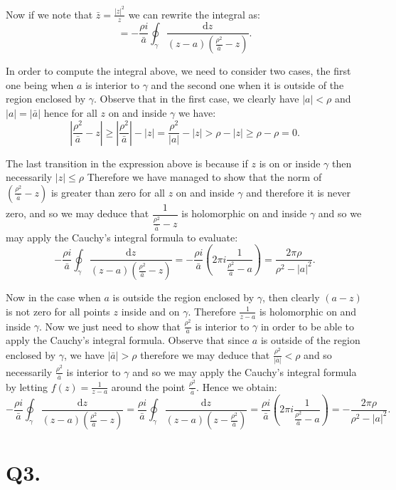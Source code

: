 \documentclass[12pt]{article}
\begin{document}
Now if we note that $\bar{z} = \frac{|z|^2}{z}$ we can rewrite the integral as:
\[
	= - \frac{\rho i}{\bar{a}}\oint_\gamma \frac{\text{d}z}{(z - a) (\frac{\rho^2}{\bar{a}} - z)} 
.\]

In order to compute the integral above, we need to consider two cases, the first one being when $a$ is interior to 
 $\gamma$ and the second one when  it is outside of the region enclosed by $\gamma$. 
 Observe that in the first case, we clearly have $|a| < \rho$ and $|a| = |\bar{a}|$ hence for all  $z$ on and inside  $\gamma$ we have:
\[
 \left|\frac{\rho^2}{\bar{a}} - z\right| \ge \left|\frac{\rho^2}{\bar{a}}\right| - |z| = 
	 \frac{\rho^2}{|a|} - |z| > \rho - |z| \geq \rho - \rho = 0
.\]

The last transition in the expression above is because if $z$ is on or inside $\gamma$ then necessarily $|z| \leq \rho$
Therefore we have managed to show that the norm of $(\frac{\rho^2}{\bar{a}} - z)$ is greater than zero for all $z$ on 
and inside $\gamma$ and therefore it is never zero, and so we may deduce that  $\dfrac{1}{\frac{\rho^2}{\bar{a}} - z}$ 
is holomorphic on and inside $\gamma$ and so we may apply the Cauchy's integral formula to evaluate:
\[
	- \frac{\rho i}{\bar{a}}\oint_\gamma \frac{\text{d}z}{(z - a) (\frac{\rho^2}{\bar{a}} - z)} = 
	- \frac{\rho i}{\bar{a}}\left(2\pi i \frac{1}{\frac{\rho^2}{\bar{a}} - a} \right) 
	= \frac{2 \pi \rho}{\rho^2 - |a|^2}
.\]

Now in the case when $a$ is outside the region enclosed by $\gamma$, then clearly $(a - z)$ is not zero for all points
	$z$ inside and on  $\gamma$. Therefore  $\frac{1}{z - a}$ is holomorphic on and inside $\gamma$. 
Now we just need to show that  $\frac{\rho^2}{\bar{a}}$ is interior to $\gamma$ in order to be able to apply the 
Cauchy's integral formula. Observe that since $a$ is outside of the region enclosed by  $\gamma$, we have
$|\bar{a}| > \rho $ therefore we may deduce that $\frac{\rho^2}{|\bar{a}|} < \rho$ and so necessarily 
$\frac{\rho^2}{\bar{a}}$ is interior to $\gamma$ and so we may apply the Cauchy's integral formula by letting  $f(z) = \frac{1}{z - a}$ around the point $\frac{\rho^2}{\bar{a}}$. Hence we obtain:
\[
	- \frac{\rho i}{\bar{a}}\oint_\gamma \frac{\text{d}z}{(z - a) (\frac{\rho^2}{\bar{a}} - z)} = 
	 \frac{\rho i}{\bar{a}}\oint_\gamma \frac{\text{d}z}{(z - a) (z - \frac{\rho^2}{\bar{a}})} = 
	 \frac{\rho i}{\bar{a}}\left(2\pi i \frac{1}{\frac{\rho^2}{\bar{a}} - a} \right) =
	 - \frac{2 \pi \rho}{\rho^2 - |a|^2}
.\]

\section*{Q3.}
\end{document}
